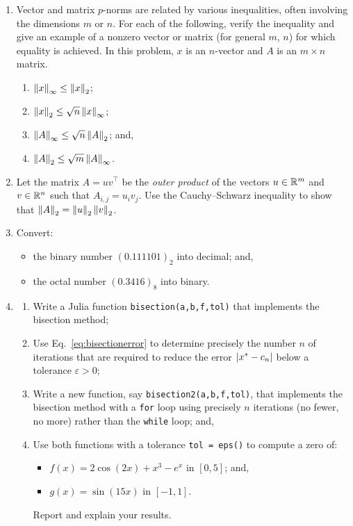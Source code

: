 \begin{enumerate}

\item Vector and matrix $p$-norms are related by various inequalities, often involving the dimensions $m$ or $n$. For each of the following, verify the inequality and give an example of a nonzero vector or matrix (for general $m$, $n$) for which equality is achieved. In this problem, $x$ is an $n$-vector and $A$ is an $m\times n$ matrix.
\begin{enumerate}
\item $\left\|{x}\right\|_\infty \le \left\|{x}\right\|_2$;
\item $\left\|{x}\right\|_2 \le \sqrt{n}\left\|{x}\right\|_\infty$;
\item $\left\|{A}\right\|_\infty \le \sqrt{n}\left\|{A}\right\|_2$; and,
\item $\left\|{A}\right\|_2 \le \sqrt{m}\left\|{A}\right\|_\infty$.
\end{enumerate}

\item Let the matrix $A = uv^\top$ be the {\em outer product} of the vectors $u\in\mathbb{R}^m$ and $v\in\mathbb{R}^n$ such that $A_{i,j} = u_iv_j$. Use the Cauchy--Schwarz inequality to show that $\left\|{A}\right\|_2 = \left\|{u}\right\|_2\left\|{v}\right\|_2$.

\item Convert:
\begin{itemize}
\item the binary number $(0.111101)_2$ into decimal; and,
\item the octal number $(0.3416)_8$ into binary.
\end{itemize}

\item \begin{enumerate}
\item Write a {\sc Julia} function {\tt bisection(a,b,f,tol)} that implements the bisection method;
\item Use Eq.~\eqref{eq:bisectionerror} to determine precisely the number $n$ of iterations that are required to reduce the error $\left|{x^*-c_n}\right|$ below a tolerance $\varepsilon>0$;
\item Write a new function, say {\tt bisection2(a,b,f,tol)}, that implements the bisection method with a {\tt for} loop using precisely $n$ iterations (no fewer, no more) rather than the {\tt while} loop; and,

\item Use both functions with a tolerance {\tt tol = eps()} to compute a zero of:
\begin{itemize}
\item $f(x) = 2\cos(2x)+x^3-e^x$ in $[0,5]$; and,
\item $g(x) = \sin(15x)$ in $[-1,1]$.
\end{itemize}
Report and explain your results.
\end{enumerate}


\end{enumerate}
